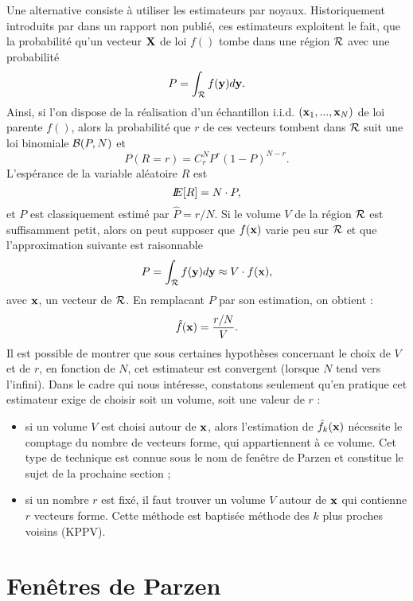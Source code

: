 Une alternative consiste \`a utiliser les estimateurs par noyaux.
Historiquement introduits par  dans un
rapport non publi\'e, ces estimateurs
exploitent le fait, que la probabilit\'e qu'un vecteur $\mbox{\bf X}$ de loi $f()$
tombe dans une r\'egion ${\cal R}$ avec une probabilit\'e 
$$
P=\int_{\cal R} f(\mbox{\bf y})d\mbox{\bf y}.
$$ 
Ainsi, si l'on dispose de la r\'ealisation d'un \'echantillon i.i.d. $(\mbox{\bf x}_1,...,\mbox{\bf x}_{N})$
de loi parente $f()$, alors la probabilit\'e que $r$ de ces vecteurs tombent dans ${\cal R}$
suit une loi binomiale ${\cal B}(P,N)$ et
$$
P(R=r)=C_{r}^{N} P^r(1-P)^{N-r}.
$$
L'esp\'erance de la variable al\'eatoire $R$ est
$$
I\!\!E[R]=N \cdot P,
$$
et $P$ est classiquement estim\'e par $\hat{P}=r/N$.
Si le volume $V$ de la r\'egion ${\cal R}$ est suffisamment petit, alors on peut supposer
que $f(\mbox{\bf x})$ varie  peu sur ${\cal R}$ et que l'approximation suivante est raisonnable
$$
P=\int_{\cal R} f(\mbox{\bf y})d\mbox{\bf y} \approx V \cdot f(\mbox{\bf x}), 
$$
avec $\mbox{\bf x}$, un vecteur de ${\cal R}$. En remplacant $P$ par son estimation, on obtient : 
$$
\hat{f}(\mbox{\bf x})=\frac{r/N}{V}.
$$
Il est possible de montrer que sous certaines hypoth\`eses concernant le choix de $V$ et de $r$,
en fonction de $N$, cet estimateur est convergent (lorsque $N$ tend vers l'infini). Dans le cadre
qui nous int\'eresse, constatons seulement qu'en pratique cet estimateur exige de 
choisir soit un volume, soit une valeur de $r$ :
\begin{itemize}
\item
si un volume $V$ est choisi autour de $\mbox{\bf x}$, alors l'estimation de $\hat{f}_k(\mbox{\bf x})$
n\'ecessite le comptage du nombre de vecteurs forme, qui appartiennent \`a ce volume.
Cet type de technique est connue sous le nom de fen\^etre de Parzen et constitue
le sujet de la prochaine section ;
\item
si un nombre $r$ est fix\'e, il faut trouver un volume $V$ autour de $\mbox{\bf x}$ qui
contienne $r$ vecteurs forme. Cette m\'ethode est baptis\'ee m\'ethode des 
$k$ plus proches voisins (KPPV). 
\end{itemize}  

\section{Fen\^etres de Parzen}

